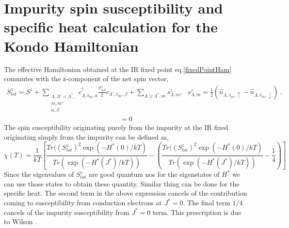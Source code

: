 \documentclass[aps,prl,preprint,groupedaddress]{revtex4-2}
\begin{document}
\section{Impurity spin susceptibility and specific heat calculation for the Kondo Hamiltonian}
The effective Hamiltonian obtained at the IR fixed point eq.\eqref{fixedPointHam} commutes with the z-component of the net spin vector,
\begin{eqnarray}
S^{z}_{tot}=S^{z}+\sum_{\substack{\Lambda,\Lambda'<\Lambda^{*},\\ m,m'\\\alpha,\beta}}c^{\dagger}_{\Lambda,\hat{s}_{m},\alpha}\frac{\sigma_{\alpha\beta}^{z}}{2}c_{\Lambda',\hat{s}_{m'},\beta}+\sum_{\Lambda\geq \Lambda^{*},m}s^{z}_{\Lambda,m},~~~ s^{z}_{\Lambda,m}=\frac{1}{2}\left(\hat{n}_{\Lambda,\hat{s}_{m},\uparrow}-\hat{n}_{\Lambda,\hat{s}_{m},\downarrow}\right)~.~~~
\end{eqnarray}
\begin{eqnarray}
[H^{*},S^{z}_{tot}]=0
\end{eqnarray}
The spin susceptibility originating purely from the impurity at the IR fixed originating simply from the impurity can be defined as,
\begin{equation}
\chi(T)=\frac{1}{kT}\left[\frac{Tr((S^{z}_{tot})^{2}\exp(-H^{*}(0)/kT)}{Tr(\exp(-H^{*}(J^{*})/kT))}-\left(\frac{Tr((S^{z}_{tot})^{2}\exp(-H^{*}(0)/kT)}{Tr(\exp(-H^{*}(J^{*})/kT))}-\frac{1}{4}\right)\right]
\end{equation}
Since the eigenvalues of $S^{z}_{tot}$ are good quantum nos for the eigenstates of $H^{*}$ we can use those states to obtain these quantity. Similar thing can be done for the specific heat. The second term in the above expression cancels of the contribution coming to susceptibility from conduction electrons at $J^{*}=0$. The final term $1/4$ cancels of the impurity susceptibility from $J^{*}=0$ term. This prescription is due to Wilson \cite{wilson1975}.
\end{document}

